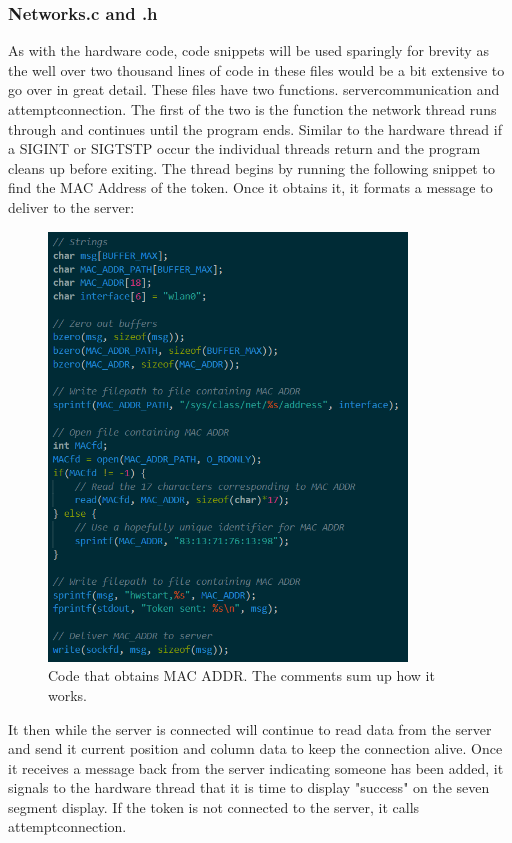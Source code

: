 \documentclass[a4paper,10pt]{article}
\begin{document}
\subsubsection{Networks.c and .h}
As with the hardware code, code snippets will be used sparingly for brevity as the well over two thousand lines of code in these files would be a bit extensive to go over in great detail. These files have two functions. server\textunderscore communication and attempt\textunderscore connection. The first of the two is the function the network thread runs through and continues until the program ends. Similar to the hardware thread if a SIGINT or SIGTSTP occur the individual threads return and the program cleans up before exiting. The thread begins by running the following snippet to find the MAC Address of the token. Once it obtains it, it formats a message to deliver to the server:

 \begin{figure}[H]
  \centering
      \includegraphics[width=0.85\textwidth]{Assets/MAC_ADDR_C.png}
  \caption{Code that obtains MAC ADDR. The comments sum up how it works.}
\end{figure}

It then while the server is connected will continue to read data from the server and send it current position and column data to keep the connection alive. Once it receives a message back from the server indicating someone has been added, it signals to the hardware thread that it is time to display "success" on the seven segment display. If the token is not connected to the server, it calls attempt\textunderscore connection.
\end{document}
